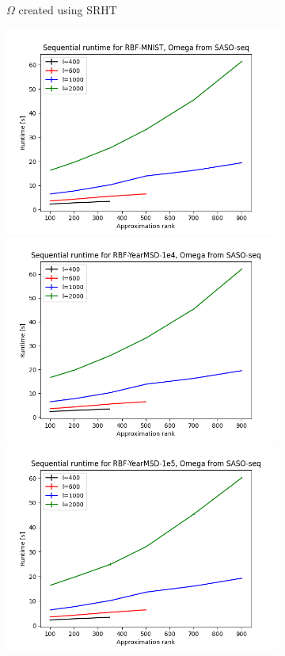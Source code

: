 \documentclass{article}
\theoremstyle{definition}
\begin{document}
\begin{figure}
\begin{subfigure}[t]{\textwidth+20pt\relax}
    \caption{$\Omega$ created using SRHT}
\end{subfigure}\hfill
\begin{subfigure}[t]{0.35\textwidth}
    \includegraphics[width=\textwidth]{plots/runtime_new/runtime_RBF-MNIST_SASO-seq.png}
    \includegraphics[width=\textwidth]{plots/runtime_new/runtime_RBF-YearMSD-1e4_SASO-seq.png}
    \includegraphics[width=\textwidth]{plots/runtime_new/runtime_RBF-YearMSD-1e5_SASO-seq.png}

\end{subfigure}
\end{figure}
\end{document}
